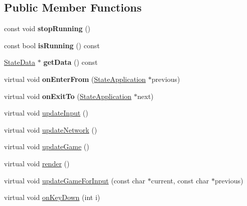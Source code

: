 \subsection*{Public Member Functions}
\begin{DoxyCompactItemize}
\item 
\hypertarget{class_state_application_ac3a41cc62a72833dd5ca1ff39ba4a65f}{const void {\bfseries stop\-Running} ()}\label{class_state_application_ac3a41cc62a72833dd5ca1ff39ba4a65f}

\item 
\hypertarget{class_state_application_ae8509c3504cd3925321875f788483d1b}{const bool {\bfseries is\-Running} () const }\label{class_state_application_ae8509c3504cd3925321875f788483d1b}

\item 
\hypertarget{class_state_application_a8096cab73eb046ebcfae2f9a9530dde4}{\hyperlink{struct_state_data}{State\-Data} $\ast$ {\bfseries get\-Data} () const }\label{class_state_application_a8096cab73eb046ebcfae2f9a9530dde4}

\item 
\hypertarget{class_state_application_a9542ff77e227b53e41ed1199b1eb430a}{virtual void {\bfseries on\-Enter\-From} (\hyperlink{class_state_application}{State\-Application} $\ast$previous)}\label{class_state_application_a9542ff77e227b53e41ed1199b1eb430a}

\item 
\hypertarget{class_state_application_a6b4c68eb272196c0ce78e2edb56ecc80}{virtual void {\bfseries on\-Exit\-To} (\hyperlink{class_state_application}{State\-Application} $\ast$next)}\label{class_state_application_a6b4c68eb272196c0ce78e2edb56ecc80}

\item 
virtual void \hyperlink{class_state_application_aa23f7bb0379af168a9d261acbb580cc4}{update\-Input} ()
\item 
virtual void \hyperlink{class_state_application_a55c3922d9e1be3e3ef39f7252c698fc4}{update\-Network} ()
\item 
virtual void \hyperlink{class_state_application_ae8c352707a7a61196ad655f0e357faff}{update\-Game} ()
\item 
virtual void \hyperlink{class_state_application_abf6724778903f7f4f9106d4be5a1f9f4}{render} ()
\item 
virtual void \hyperlink{class_state_application_a32ae34ecad2716a916e1342a10c1f620}{update\-Game\-For\-Input} (const char $\ast$current, const char $\ast$previous)
\item 
virtual void \hyperlink{class_state_application_a386fc53c7629d80d25dc86b2ad431406}{on\-Key\-Down} (int i)
\end{DoxyCompactItemize}
